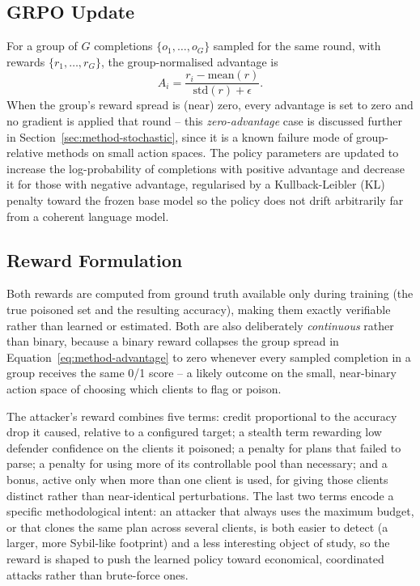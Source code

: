 \subsection{GRPO Update}
For a group of $G$ completions $\{o_1, \ldots, o_G\}$ sampled for the same round, with rewards $\{r_1, \ldots, r_G\}$, the group-normalised advantage is
\begin{equation}
A_i = \frac{r_i - \text{mean}(r)}{\text{std}(r) + \epsilon}.
\label{eq:method-advantage}
\end{equation}
When the group's reward spread is (near) zero, every advantage is set to zero and no gradient is applied that round -- this \emph{zero-advantage} case is discussed further in Section~\ref{sec:method-stochastic}, since it is a known failure mode of group-relative methods on small action spaces. The policy parameters are updated to increase the log-probability of completions with positive advantage and decrease it for those with negative advantage, regularised by a Kullback-Leibler (KL) penalty toward the frozen base model so the policy does not drift arbitrarily far from a coherent language model.

\subsection{Reward Formulation}
\label{sec:method-rewards}
Both rewards are computed from ground truth available only during training (the true poisoned set and the resulting accuracy), making them exactly verifiable rather than learned or estimated. Both are also deliberately \emph{continuous} rather than binary, because a binary reward collapses the group spread in Equation~\ref{eq:method-advantage} to zero whenever every sampled completion in a group receives the same 0/1 score -- a likely outcome on the small, near-binary action space of choosing which clients to flag or poison.

The attacker's reward combines five terms: credit proportional to the accuracy drop it caused, relative to a configured target; a stealth term rewarding low defender confidence on the clients it poisoned; a penalty for plans that failed to parse; a penalty for using more of its controllable pool than necessary; and a bonus, active only when more than one client is used, for giving those clients distinct rather than near-identical perturbations. The last two terms encode a specific methodological intent: an attacker that always uses the maximum budget, or that clones the same plan across several clients, is both easier to detect (a larger, more Sybil-like footprint) and a less interesting object of study, so the reward is shaped to push the learned policy toward economical, coordinated attacks rather than brute-force ones.

